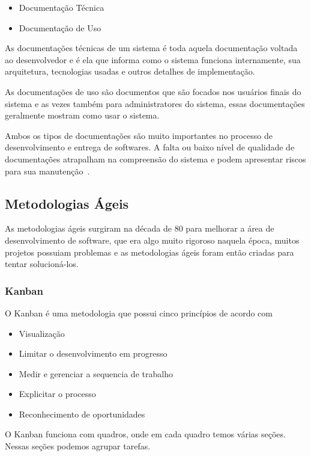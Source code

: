 \documentclass[12pt]{article}
\begin{document}
\begin{itemize}
	\item Documentação Técnica
	\item Documentação de Uso
\end{itemize}

As documentações técnicas de um sistema é toda aquela documentação voltada ao desenvolvedor e é
ela que informa como o sistema funciona internamente, sua arquitetura, tecnologias usadas e outros detalhes de implementação.

As documentações de uso são documentos que são focados nos usuários finais do sistema e as vezes também para administratores do sistema,
essas documentações geralmente mostram como usar o sistema.

Ambos os tipos de documentações são muito importantes no processo de desenvolvimento e entrega de softwares. A falta ou
baixo nível de qualidade de documentações atrapalham na compreensão do sistema e podem apresentar
riscos para sua manutenção~\cite{deinvestigaccao}.

\subsection{Metodologias Ágeis}

As metodologias ágeis surgiram na década de 80 para melhorar a área de desenvolvimento de software,
que era algo muito rigoroso naquela época, muitos projetos possuiam problemas e as metodologias ágeis foram então
criadas para tentar solucioná-los.~\cite{Santos05}

\subsubsection{Kanban}

O Kanban é uma metodologia que possui cinco princípios de acordo com~\cite{Agile06}
\begin{itemize}
  \item Visualização
  \item Limitar o desenvolvimento em progresso
  \item Medir e gerenciar a sequencia de trabalho
  \item Explicitar o processo
  \item Reconhecimento de oportunidades
\end{itemize}

O Kanban funciona com quadros, onde em cada quadro temos várias seções.
Nessas seções podemos agrupar tarefas.
\end{document}
